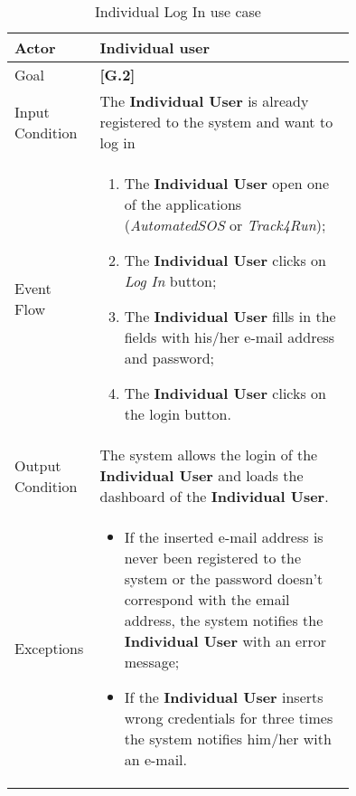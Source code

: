 \begin{center}
\begin{table}
\begin{tabular}{ | l | p{0.75\linewidth} | }
  \hline
    Actor & \textbf{Individual user} \\ \hline
    Goal & \textbf{[G.2]} \\ \hline
    Input Condition & The \textbf{Individual User} is already registered to the system and want to log in \\ \hline
    Event Flow & \begin{minipage}[t]{0.7\textwidth}
      \begin{enumerate}
        \item The \textbf{Individual User} open one of the applications (\textit{AutomatedSOS} or \textit{Track4Run});
        \item The \textbf{Individual User} clicks on \textit{Log In} button;
        \item The \textbf{Individual User} fills in the fields with his/her e-mail address and password;
        \item The \textbf{Individual User} clicks on the login button.
      \end{enumerate}
    \smallskip
  \end{minipage} \\ \hline
  Output Condition & The system allows the login of the \textbf{Individual User} and loads the dashboard of the \textbf{Individual User}. \\ \hline
  Exceptions & \begin{minipage}[t]{0.7\textwidth}
    \begin{itemize}
      \smallskip
      \item If the inserted e-mail address is never been registered to the system or the password doesn’t correspond with the email address, the system notifies the \textbf{Individual User} with an error message;
      \item If the \textbf{Individual User} inserts wrong credentials for three times the system notifies him/her with an e-mail.
    \end{itemize}
    \smallskip
  \end{minipage}  \\ \hline
\end{tabular}
\caption{Individual Log In use case}
\label{table:individualLogInInTable}
\end{table}
\end{center}
